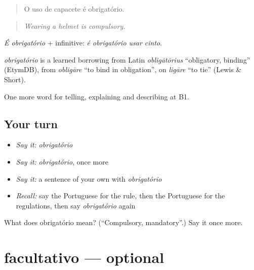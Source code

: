 \begin{quote}
O uso de capacete é obrigatório.
\end{quote}

\begin{quote}
\emph{Wearing a helmet is compulsory.}
\end{quote}

\emph{É obrigatório} + infinitive: \emph{é obrigatório usar cinto}.

\begin{cousinweb}
\emph{obrigatório} is a learned borrowing from Latin \emph{obligātōrius} \textquotedblleft{}obligatory, binding\textquotedblright{} (EtymDB), from \emph{obligāre} \textquotedblleft{}to bind in obligation\textquotedblright{}, on \emph{ligāre} \textquotedblleft{}to tie\textquotedblright{} (Lewis \& Short).
\end{cousinweb}

\begin{grammarlens}[title={What you've built}]
One more word for telling, explaining and describing at B1.
\end{grammarlens}

\subsection*{Your turn}
\begin{itemize}
\raggedright
  \item \emph{Say it:} \emph{obrigatório}
  \item \emph{Say it:} \emph{obrigatório}, once more
  \item \emph{Say it:} a sentence of your own with \emph{obrigatório}
  \item \emph{Recall:} say the Portuguese for the rule, then the Portuguese for the regulations, then say \emph{obrigatório} again
\end{itemize}

\begin{tcolorbox}[breakable,colback=teal!4,colframe=teal!35!black,title={Before you move on}]
What does obrigatório mean? (\textquotedblleft{}Compulsory, mandatory\textquotedblright{}.) Say it once more.
\end{tcolorbox}
\section[facultativo]{facultativo — optional}

\label{lesson:PT-C381-facultativo}



